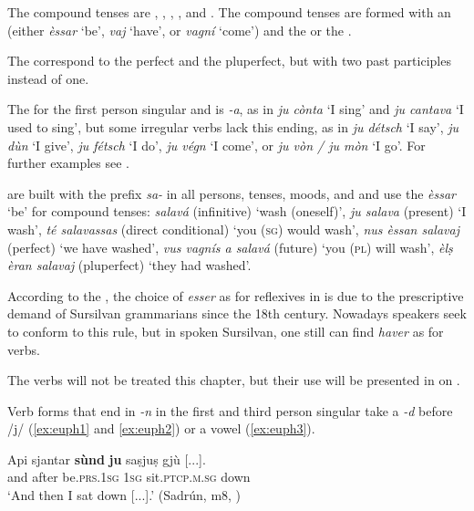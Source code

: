 The compound tenses are , , ,  , and . The compound tenses are formed with an  (either \textit{èssar} `be', \textit{vaj} `have', or \textit{vagní} `come') and the  or the . 

The  correspond to the perfect and the pluperfect, but with two past participles instead of one.

The  for the first person singular  and  is \textit{-a}, as in \textit{ju cònta} `I sing' and \textit{ju cantava} `I used to sing', but some irregular verbs lack this ending, as in  \textit{ju détsch} `I say', \textit{ju dùn} `I give', \textit{ju fétsch} `I do', \textit{ju végn} `I come', or \textit{ju vòn / ju mòn} `I go'. For further examples see .

 are built with the prefix \textit{sa-} in all persons, tenses, moods, and  and use the  \textit{èssar} `be' for compound tenses: \textit{salavá} (infinitive) `wash (oneself)', \textit{ju salava} (present) `I wash', \textit{té salavassas} (direct conditional) `you (\textsc{sg}) would wash', \textit{nus èssan salavaj} (perfect) `we have washed', \textit{vus vagnís a salavá} (future) `you (\textsc{pl}) will wash', \textit{èlṣ èran salavaj} (pluperfect) `they had washed'.

According to the , the choice of \textit{esser} as  for reflexives in  is due to the prescriptive demand of Sursilvan grammarians since the 18th century. Nowadays speakers seek to conform to this rule, but in spoken Sursilvan, one still can find \textit{haver} as  for  verbs.

The  verbs will not be treated this chapter, but their use will be presented in  on .

Verb forms that end in \textit{-n} in the first and third person singular  take a  \textit{-d} before /j/ (\ref{ex:euph1} and \ref{ex:euph2}) or a vowel (\ref{ex:euph3}).

\ea
\label{ex:euph1}
\gll  Api sjantar \textbf{sùnd} \textbf{ju} saṣjuṣ gjù [...].\\
and after be.\textsc{prs.1sg} \textsc{1sg} sit.\textsc{ptcp.m.sg} down\\
\glt `And then I sat down [...].' (Sadrún, m8, )
\z

